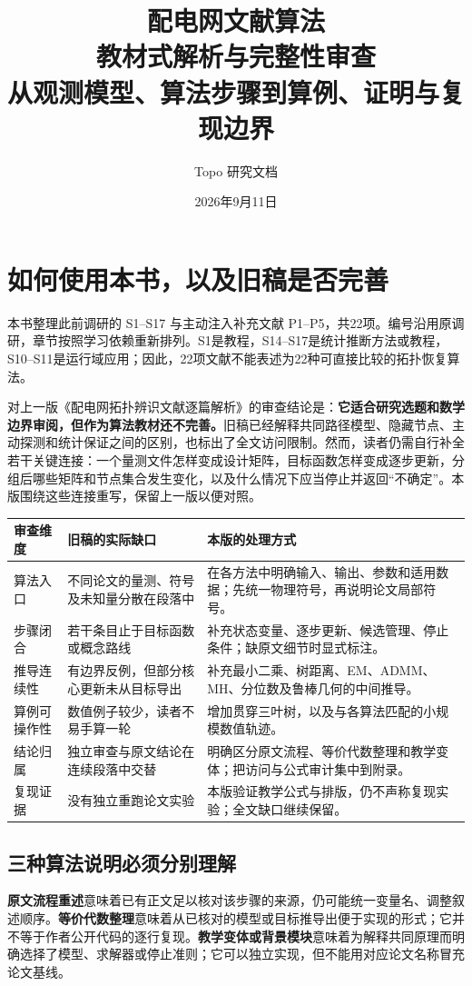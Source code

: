 \documentclass[UTF8,11pt,fontset=fandol,openany,oneside]{ctexbook}
\title{配电网文献算法\\[0.6em]\Large 教材式解析与完整性审查\\[0.8em]\large 从观测模型、算法步骤到算例、证明与复现边界}
\author{Topo 研究文档}
\date{2026年9月11日}
\theoremstyle{definition}
\theoremstyle{remark}
\numberwithin{equation}{chapter}
\begin{document}
\frontmatter
\hypersetup{pageanchor=false}
\maketitle
\hypersetup{pageanchor=true}

\chapter*{如何使用本书，以及旧稿是否完善}
本书整理此前调研的 S1--S17 与主动注入补充文献 P1--P5，共22项。编号沿用原调研，章节按照学习依赖重新排列。S1是教程，S14--S17是统计推断方法或教程，S10--S11是运行域应用；因此，22项文献不能表述为22种可直接比较的拓扑恢复算法。

对上一版《配电网拓扑辨识文献逐篇解析》的审查结论是：\textbf{它适合研究选题和数学边界审阅，但作为算法教材还不完善。}旧稿已经解释共同路径模型、隐藏节点、主动探测和统计保证之间的区别，也标出了全文访问限制。然而，读者仍需自行补全若干关键连接：一个量测文件怎样变成设计矩阵，目标函数怎样变成逐步更新，分组后哪些矩阵和节点集合发生变化，以及什么情况下应当停止并返回“不确定”。本版围绕这些连接重写，保留上一版以便对照。

\begin{longtable}{p{}p{}p{}}
\toprule 审查维度 & 旧稿的实际缺口 & 本版的处理方式\\\midrule
\endhead
算法入口 & 不同论文的量测、符号及未知量分散在段落中 & 在各方法中明确输入、输出、参数和适用数据；先统一物理符号，再说明论文局部符号。\\
步骤闭合 & 若干条目止于目标函数或概念路线 & 补充状态变量、逐步更新、候选管理、停止条件；缺原文细节时显式标注。\\
推导连续性 & 有边界反例，但部分核心更新未从目标导出 & 补充最小二乘、树距离、EM、ADMM、MH、分位数及鲁棒几何的中间推导。\\
算例可操作性 & 数值例子较少，读者不易手算一轮 & 增加贯穿三叶树，以及与各算法匹配的小规模数值轨迹。\\
结论归属 & 独立审查与原文结论在连续段落中交替 & 明确区分原文流程、等价代数整理和教学变体；把访问与公式审计集中到附录。\\
复现证据 & 没有独立重跑论文实验 & 本版验证教学公式与排版，仍不声称复现实验；全文缺口继续保留。\\
\bottomrule
\end{longtable}

\section*{三种算法说明必须分别理解}
\textbf{原文流程重述}意味着已有正文足以核对该步骤的来源，仍可能统一变量名、调整叙述顺序。\textbf{等价代数整理}意味着从已核对的模型或目标推导出便于实现的形式；它并不等于作者公开代码的逐行复现。\textbf{教学变体或背景模块}意味着为解释共同原理而明确选择了模型、求解器或停止准则；它可以独立实现，但不能用对应论文名称冒充论文基线。
\end{document}
